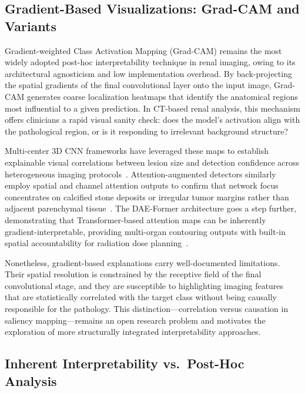 \subsection{Gradient-Based Visualizations: Grad-CAM and Variants}
\label{subsec:gradcam}

Gradient-weighted Class Activation Mapping (Grad-CAM) remains the most widely adopted post-hoc interpretability technique in renal imaging, owing to its architectural agnosticism and low implementation overhead. By back-projecting the spatial gradients of the final convolutional layer onto the input image, Grad-CAM generates coarse localization heatmaps that identify the anatomical regions most influential to a given prediction. In CT-based renal analysis, this mechanism offers clinicians a rapid visual sanity check: does the model's activation align with the pathological region, or is it responding to irrelevant background structure?

Multi-center 3D CNN frameworks have leveraged these maps to establish explainable visual correlations between lesion size and detection confidence across heterogeneous imaging protocols~\cite{liang2025multicenter}. Attention-augmented detectors similarly employ spatial and channel attention outputs to confirm that network focus concentrates on calcified stone deposits or irregular tumor margins rather than adjacent parenchymal tissue~\cite{sajid2026yolov8}. The DAE-Former architecture goes a step further, demonstrating that Transformer-based attention maps can be inherently gradient-interpretable, providing multi-organ contouring outputs with built-in spatial accountability for radiation dose planning~\cite{azad2023daeformer}.

Nonetheless, gradient-based explanations carry well-documented limitations. Their spatial resolution is constrained by the receptive field of the final convolutional stage, and they are susceptible to highlighting imaging features that are statistically correlated with the target class without being causally responsible for the pathology. This distinction---correlation versus causation in saliency mapping---remains an open research problem and motivates the exploration of more structurally integrated interpretability approaches.


\subsection{Inherent Interpretability vs.\ Post-Hoc Analysis}
\label{subsec:inherent_vs_posthoc}

